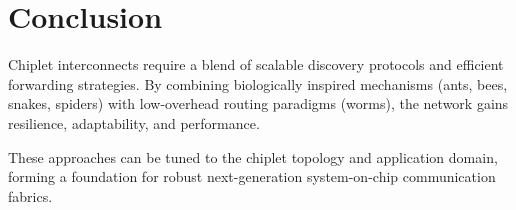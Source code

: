 \documentclass[../../../OAE-SPEC-MAIN.tex]{subfiles}
\begin{document}
\section{Conclusion}

Chiplet interconnects require a blend of scalable discovery protocols and efficient forwarding strategies. By combining biologically inspired mechanisms (ants, bees, snakes, spiders) with low-overhead routing paradigms (worms), the network gains resilience, adaptability, and performance.

These approaches can be tuned to the chiplet topology and application domain, forming a foundation for robust next-generation system-on-chip communication fabrics.
\end{document}

